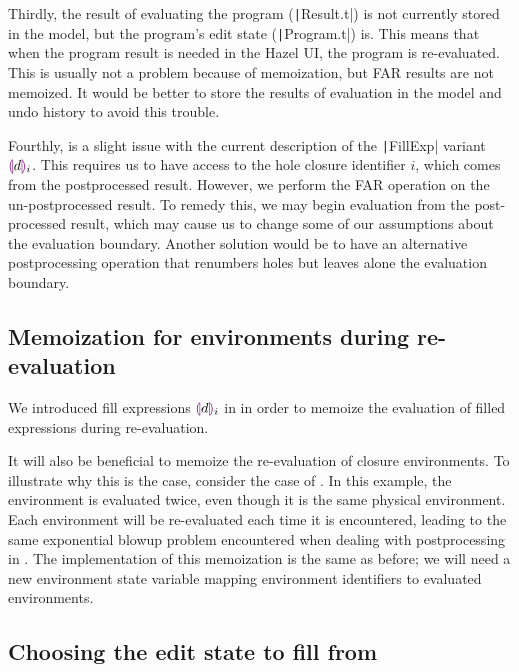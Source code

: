 Thirdly, the result of evaluating the program (\texttt|Result.t|) is not currently stored in the model, but the program's edit state (\texttt|Program.t|) is. This means that when the program result is needed in the Hazel UI, the program is re-evaluated. This is usually not a problem because of memoization, but FAR results are not memoized. It would be better to store the results of evaluation in the model and undo history to avoid this trouble.

Fourthly, is a slight issue with the current description of the \texttt|FillExp| variant $\textcolor{violet}{\llparenthesis} d\textcolor{violet}{\rrparenthesis}_i$. This requires us to have access to the hole closure identifier $i$, which comes from the postprocessed result. However, we perform the FAR operation on the un-postprocessed result. To remedy this, we may begin evaluation from the post-processed result, which may cause us to change some of our assumptions about the evaluation boundary. Another solution would be to have an alternative postprocessing operation that renumbers holes but leaves alone the evaluation boundary.

\subsection{Memoization for environments during re-evaluation}
\label{sec:far-improv-memo-envs}

We introduced fill expressions $\textcolor{violet}{\llparenthesis} d\textcolor{violet}{\rrparenthesis}_i$ in  in order to memoize the evaluation of filled expressions during re-evaluation.

It will also be beneficial to memoize the re-evaluation of closure environments. To illustrate why this is the case, consider the case of . In this example, the environment is evaluated twice, even though it is the same physical environment. Each environment will be re-evaluated each time it is encountered, leading to the same exponential blowup problem encountered when dealing with postprocessing in . The implementation of this memoization is the same as before; we will need a new environment state variable mapping environment identifiers to evaluated environments.

\subsection{Choosing the edit state to fill from}
\label{sec:far-past-edit-states}


